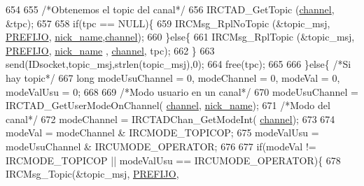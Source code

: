 \begin{DoxyCode}
{{{{{{{{{{654 
655                                         \textcolor{comment}{/*Obtenemos el topic del canal*/}
656                                         IRCTAD\_GetTopic (\hyperlink{_g-2361-06-_p1-_server_8c_a842ca2f026578e5c479c095ff3335969}{channel}, &tpc);
657 
658                                         \textcolor{keywordflow}{if}(tpc == NULL)\{
659                                                 IRCMsg\_RplNoTopic (&topic\_msj, 
      \hyperlink{_g-2361-06-_p1-_server_8h_a78c658ff923693099f7b621e7c351129}{PREFIJO}, \hyperlink{_g-2361-06-_p1-_server_8c_aabbf66718cda228b924a4a9441eadf62}{nick\_name},\hyperlink{_g-2361-06-_p1-_server_8c_a842ca2f026578e5c479c095ff3335969}{channel});
660                                         \}\textcolor{keywordflow}{else}\{
661                                                 IRCMsg\_RplTopic (&topic\_msj, 
      \hyperlink{_g-2361-06-_p1-_server_8h_a78c658ff923693099f7b621e7c351129}{PREFIJO}, \hyperlink{_g-2361-06-_p1-_server_8c_aabbf66718cda228b924a4a9441eadf62}{nick\_name} , \hyperlink{_g-2361-06-_p1-_server_8c_a842ca2f026578e5c479c095ff3335969}{channel}, tpc);
662                                         \}
663                                         send(IDsocket,topic\_msj,strlen(topic\_msj),0);
664                                         free(tpc); 
665 
666                                 \}\textcolor{keywordflow}{else}\{ \textcolor{comment}{/*Si hay topic*/}
667                                         \textcolor{keywordtype}{long} modeUsuChannel = 0, modeChannel = 0, modeVal = 0, modeValUsu =
       0;
668                                         
669                                         \textcolor{comment}{/*Modo usuario en un canal*/}
670                                         modeUsuChannel = IRCTAD\_GetUserModeOnChannel(
      \hyperlink{_g-2361-06-_p1-_server_8c_a842ca2f026578e5c479c095ff3335969}{channel}, \hyperlink{_g-2361-06-_p1-_server_8c_aabbf66718cda228b924a4a9441eadf62}{nick\_name});
671                                         \textcolor{comment}{/*Modo del canal*/}
672                                         modeChannel = IRCTADChan\_GetModeInt(
      \hyperlink{_g-2361-06-_p1-_server_8c_a842ca2f026578e5c479c095ff3335969}{channel});
673 
674                                         modeVal = modeChannel & IRCMODE\_TOPICOP;
675                                         modeValUsu = modeUsuChannel & IRCUMODE\_OPERATOR;
676 
677                                         \textcolor{keywordflow}{if}(modeVal != IRCMODE\_TOPICOP || modeValUsu == IRCUMODE\_OPERATOR)\{
678                                                 IRCMsg\_Topic(&topic\_msj, \hyperlink{_g-2361-06-_p1-_server_8h_a78c658ff923693099f7b621e7c351129}{PREFIJO}, 
}}}}}}}}}}
\end{DoxyCode}
